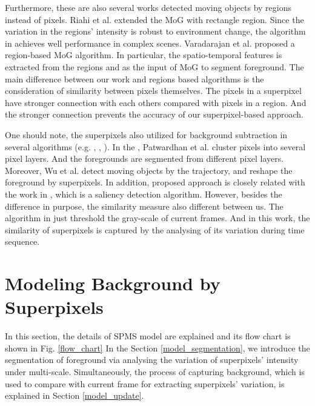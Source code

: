 \documentclass[runningheads,a4paper]{llncs}
\newcommand{\reffig}[1]{Fig. \ref{#1}}
\newcommand{\refsec}[1]{Section \ref{#1}}
\begin{document}
Furthermore, these are also several works detected moving objects by regions
instead of pixels.
Riahi et al. \cite{2012_PD_RECTGAUSS} extended the MoG with rectangle region.
Since the variation in the regions' intensity is robust to environment
change, the algorithm in
\cite{2012_PD_RECTGAUSS} achieves well performance in complex scenes.
Varadarajan et al. \cite{2013_AVSS_RMoG_Varadarajan} proposed a
region-based MoG algorithm. In particular, the spatio-temporal features
is extracted from the regions and as the input of MoG to segment
foreground.
The main difference between our work and regions based algorithms is the consideration of similarity between pixels themselves.
% 
The pixels in a superpixel have stronger connection with each others compared with pixels in a region.
%
And the stronger connection prevents the accuracy of our superpixel-based approach.

One should note, the superpixels also utilized for background subtraction in
several algorithms (e.g. \cite{2014_CVPR_Superpixel_Zhu},
\cite{2008_TPAMI_PixelLayers_Patwardhan}, \cite{2015_TCSVT_Reshape_Wu}).
In the \cite{2008_TPAMI_PixelLayers_Patwardhan}, Patwardhan et al.
\cite{2008_TPAMI_PixelLayers_Patwardhan} cluster pixels into several pixel
layers. And the foregrounds are segmented from different pixel layers.
Moreover, Wu et al. \cite{2015_TCSVT_Reshape_Wu} detect moving objects by
the trajectory, and reshape the foreground by superpixels.
In addition, proposed approach is closely related with the work in
\cite{2014_CVPR_Superpixel_Zhu}, which is a saliency detection algorithm.
However, besides the difference in purpose, the similarity measure also
different between us.
The algorithm in \cite{2014_CVPR_Superpixel_Zhu} just
threshold the gray-scale of current frames. And in this work, the similarity of
superpixels is captured by the analysing of its variation during time sequence.

\section{Modeling Background by Superpixels}
\label{model_SPMS}
In this section, the details of SPMS model are explained and its flow chart is
shown in \reffig{flow_chart}
In the \refsec{model_segmentation}, we introduce the segmentation of foreground
via analysing the variation of superpixels' intensity under multi-scale.
Simultaneously, the process of capturing background, which is used to compare
with current frame for extracting superpixels' variation, is explained in
\refsec{model_update}.
\end{document}
